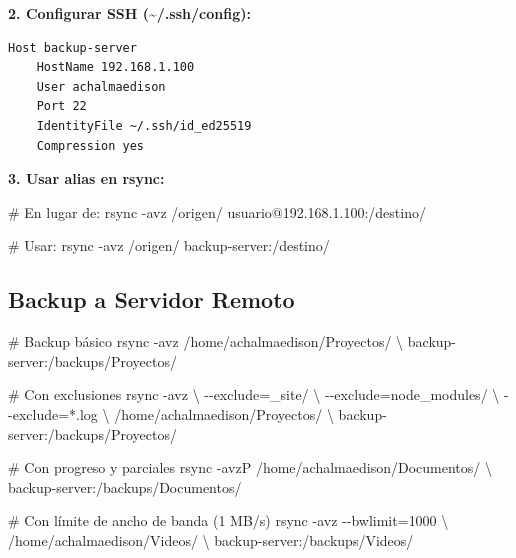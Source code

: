\documentclass[
  doc,
  floatsintext,
  longtable,
  a4paper,
  nolmodern,
  notxfonts,
  notimes,
  12pt,
  colorlinks=true,linkcolor=blue,citecolor=blue,urlcolor=blue]{apa7}
\newenvironment{Shaded}{\begin{snugshade}}{\end{snugshade}}
\newcommand{\AttributeTok}[1]{\textcolor[rgb]{0.40,0.45,0.13}{#1}}
\newcommand{\CommentTok}[1]{\textcolor[rgb]{0.37,0.37,0.37}{#1}}
\newcommand{\DataTypeTok}[1]{\textcolor[rgb]{0.68,0.00,0.00}{#1}}
\newcommand{\FunctionTok}[1]{\textcolor[rgb]{0.28,0.35,0.67}{#1}}
\newcommand{\NormalTok}[1]{\textcolor[rgb]{0.00,0.23,0.31}{#1}}
\newcommand{\OperatorTok}[1]{\textcolor[rgb]{0.37,0.37,0.37}{#1}}
\newcommand{\StringTok}[1]{\textcolor[rgb]{0.13,0.47,0.30}{#1}}
\begin{document}
\textbf{2. Configurar SSH (\textasciitilde/.ssh/config):}

\begin{verbatim}
Host backup-server
    HostName 192.168.1.100
    User achalmaedison
    Port 22
    IdentityFile ~/.ssh/id_ed25519
    Compression yes
\end{verbatim}

\textbf{3. Usar alias en rsync:}

\begin{Shaded}
\begin{Highlighting}[]
\CommentTok{\# En lugar de:}
\FunctionTok{rsync} \AttributeTok{{-}avz}\NormalTok{ /origen/ usuario@192.168.1.100:/destino/}

\CommentTok{\# Usar:}
\FunctionTok{rsync} \AttributeTok{{-}avz}\NormalTok{ /origen/ backup{-}server:/destino/}
\end{Highlighting}
\end{Shaded}

\subsection{Backup a Servidor Remoto}\label{backup-a-servidor-remoto}

\begin{Shaded}
\begin{Highlighting}[]
\CommentTok{\# Backup básico}
\FunctionTok{rsync} \AttributeTok{{-}avz}\NormalTok{ /home/achalmaedison/Proyectos/ }\DataTypeTok{\textbackslash{}}
\NormalTok{  backup{-}server:/backups/Proyectos/}

\CommentTok{\# Con exclusiones}
\FunctionTok{rsync} \AttributeTok{{-}avz} \DataTypeTok{\textbackslash{}}
  \AttributeTok{{-}{-}exclude}\OperatorTok{=}\StringTok{\textquotesingle{}\_site/\textquotesingle{}} \DataTypeTok{\textbackslash{}}
  \AttributeTok{{-}{-}exclude}\OperatorTok{=}\StringTok{\textquotesingle{}node\_modules/\textquotesingle{}} \DataTypeTok{\textbackslash{}}
  \AttributeTok{{-}{-}exclude}\OperatorTok{=}\StringTok{\textquotesingle{}*.log\textquotesingle{}} \DataTypeTok{\textbackslash{}}
\NormalTok{  /home/achalmaedison/Proyectos/ }\DataTypeTok{\textbackslash{}}
\NormalTok{  backup{-}server:/backups/Proyectos/}

\CommentTok{\# Con progreso y parciales}
\FunctionTok{rsync} \AttributeTok{{-}avzP}\NormalTok{ /home/achalmaedison/Documentos/ }\DataTypeTok{\textbackslash{}}
\NormalTok{  backup{-}server:/backups/Documentos/}

\CommentTok{\# Con límite de ancho de banda (1 MB/s)}
\FunctionTok{rsync} \AttributeTok{{-}avz} \AttributeTok{{-}{-}bwlimit}\OperatorTok{=}\NormalTok{1000 }\DataTypeTok{\textbackslash{}}
\NormalTok{  /home/achalmaedison/Videos/ }\DataTypeTok{\textbackslash{}}
\NormalTok{  backup{-}server:/backups/Videos/}
\end{Highlighting}
\end{Shaded}
\end{document}
